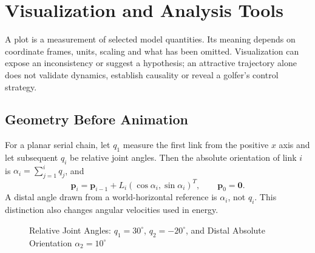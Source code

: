 \chapter{Visualization and Analysis Tools}
\label{ch:visualization}

A plot is a measurement of selected model quantities. Its meaning depends on
coordinate frames, units, scaling and what has been omitted. Visualization can
expose an inconsistency or suggest a hypothesis; an attractive trajectory alone
does not validate dynamics, establish causality or reveal a golfer's control
strategy.

\section{Geometry Before Animation}

For a planar serial chain, let $q_1$ measure the first link from the positive
$x$ axis and let subsequent $q_i$ be relative joint angles. Then the absolute
orientation of link $i$ is $\alpha_i=\sum_{j=1}^{i}q_j$, and
\begin{equation}
  \bm{p}_i=\bm{p}_{i-1}
       +L_i(\cos\alpha_i,\sin\alpha_i)^T,\qquad \bm{p}_0=\bm{0}.
\end{equation}
A distal angle drawn from a world-horizontal reference is $\alpha_i$, not
$q_i$. This distinction also changes angular velocities used in energy.

\begin{figure}[ht]
  \centering
  \caption{Relative Joint Angles: $q_1=30^\circ$, $q_2=-20^\circ$,
  and Distal Absolute Orientation $\alpha_2=10^\circ$}
  \label{fig:stick-figure}
\end{figure}


